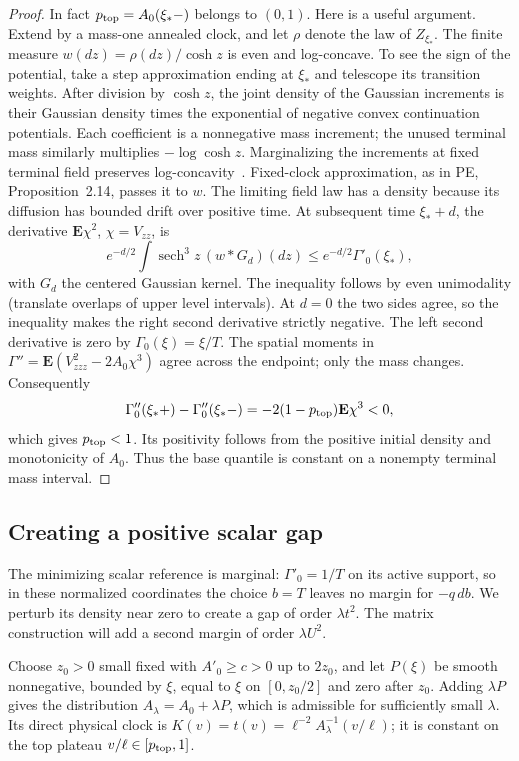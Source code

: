 \begin{proof}
In fact \(p_{\rm top}=A_0(\xi_*-)\) belongs to \((0,1)\). Here is a useful argument. Extend by a mass-one annealed clock, and let \(\rho\) denote the law of \(Z_{\xi_*}\). The finite measure \(w(dz)=\rho(dz)/\cosh z\) is even and log-concave.
To see the sign of the potential, take a step approximation ending at
\(\xi_*\) and telescope its transition weights. After division by
\(\cosh z\), the joint density of the Gaussian increments is their
Gaussian density times the exponential of negative convex continuation
potentials. Each coefficient is a nonnegative mass increment; the
unused terminal mass similarly multiplies \(-\log\cosh z\).
Marginalizing the increments at fixed terminal field preserves
log-concavity~\cite{Prekopa1973}. Fixed-clock approximation, as in PE,
Proposition~2.14, passes it to \(w\). The limiting field law has a
density because its diffusion has bounded drift over positive time. At subsequent time \(\xi_*+d\), the derivative \(\mathbf E\chi^2\), \(\chi=V_{zz}\), is
\[
 e^{-d/2}\int\operatorname{sech}^3 z\,(w*G_d)(dz)
 \le e^{-d/2}\Gamma'_0(\xi_*),
\]
with \(G_d\) the centered Gaussian kernel. The inequality follows by even unimodality (translate overlaps of upper level intervals). At \(d=0\) the two sides agree, so the inequality makes the right
second derivative strictly negative. The left second derivative is
zero by \(\Gamma_0(\xi)=\xi/T\). The spatial moments in
\(\Gamma''=\mathbf E(V_{zzz}^2-2A_0\chi^3)\) agree across the
endpoint; only the mass changes. Consequently
\[
 \Gamma_0''(\xi_*+)-\Gamma_0''(\xi_*-)
 =-2(1-p_{\rm top})\mathbf E\chi^3<0,
\]
which gives \(p_{\rm top}<1\). Its positivity follows from the
positive initial density and monotonicity of \(A_0\). Thus the base
quantile is constant on a nonempty terminal mass interval.

\end{proof}

\subsection{Creating a positive scalar gap}

The minimizing scalar reference is marginal: \(\Gamma'_0=1/T\)
on its active support, so in these normalized coordinates the choice
\(b=T\) leaves no margin for \(-q\,db\). We perturb its density
near zero to create a gap of order \(\lambda t^2\). The matrix
construction will add a second margin of order \(\lambda U^2\).

Choose \(z_0>0\) small fixed with \(A'_0\ge c>0\) up to \(2z_0\), and let \(P(\xi)\) be smooth nonnegative, bounded by \(\xi\), equal to \(\xi\) on \([0,z_0/2]\) and zero after \(z_0\). Adding \(\lambda P\) gives the distribution
\(A_\lambda=A_0+\lambda P\), which is admissible for sufficiently
small \(\lambda\). Its direct physical clock is
\(K(v)=t(v)=\ell^{-2}A_\lambda^{-1}(v/\ell)\); it is constant
on the top plateau \(v/\ell\in[p_{\rm top},1]\).


